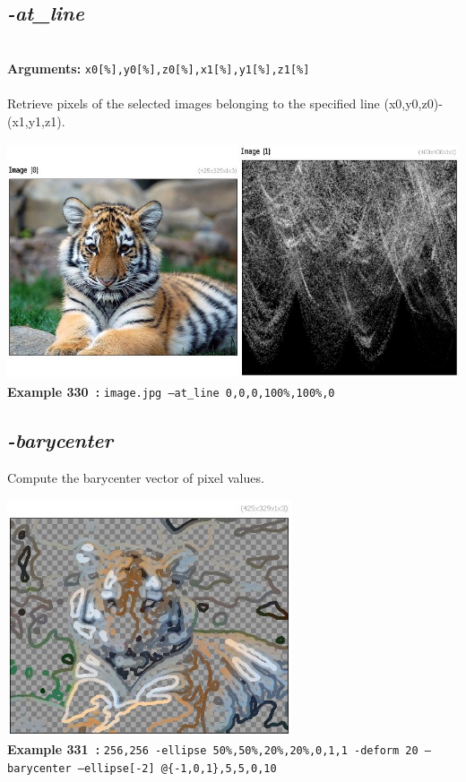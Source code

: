 \documentclass[a4paper,11pt,twoside]{book}
\begin{document}
\subsection{\emph{-at\_line} }\vspace*{-0.5em}
~\\\textbf{Arguments: } 
{\small \texttt{x0[\%],y0[\%],z0[\%],x1[\%],y1[\%],z1[\%]}}\\~\\
Retrieve pixels of the selected images belonging to the specified line (x0,y0,z0)-(x1,y1,z1).
\begin{center}\includegraphics[keepaspectratio=true,height=7cm,width=\textwidth]{img/gmic_def330.jpg}\\
{\footnotesize \textbf{Example 330~:} \texttt{image.jpg --at\_line 0,0,0,100\%,100\%,0}}
\end{center}

\subsection{\emph{-barycenter} }\vspace*{-0.5em}
Compute the barycenter vector of pixel values.
\begin{center}\includegraphics[keepaspectratio=true,height=7cm,width=\textwidth]{img/gmic_def331.jpg}\\
{\footnotesize \textbf{Example 331~:} \texttt{256,256 -ellipse 50\%,50\%,20\%,20\%,0,1,1 -deform 20 --barycenter --ellipse[-2] @\{-1,0,1\},5,5,0,10}}
\end{center}
\end{document}
